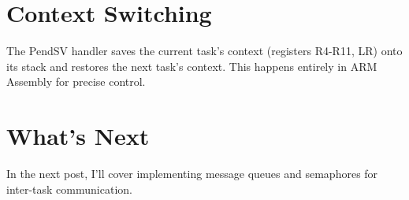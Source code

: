 \section{Context Switching}

The PendSV handler saves the current task's context (registers R4-R11, LR) onto its stack and restores the next task's context. This happens entirely in ARM Assembly for precise control.

\section{What's Next}

In the next post, I'll cover implementing message queues and semaphores for inter-task communication.



